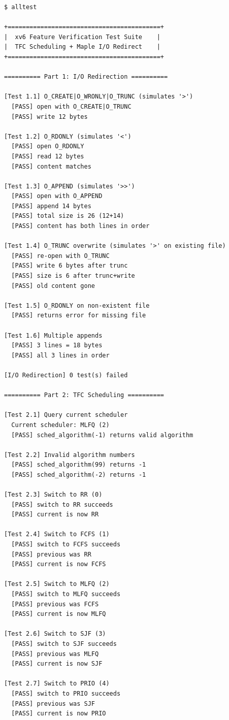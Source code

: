 \documentclass[12pt,a4paper]{ctexart}
\begin{document}
\begin{lstlisting}[caption={alltest 完整运行结果（43项全部通过）}]
$ alltest

+==========================================+
|  xv6 Feature Verification Test Suite    |
|  TFC Scheduling + Maple I/O Redirect    |
+==========================================+

========== Part 1: I/O Redirection ==========

[Test 1.1] O_CREATE|O_WRONLY|O_TRUNC (simulates '>')
  [PASS] open with O_CREATE|O_TRUNC
  [PASS] write 12 bytes

[Test 1.2] O_RDONLY (simulates '<')
  [PASS] open O_RDONLY
  [PASS] read 12 bytes
  [PASS] content matches

[Test 1.3] O_APPEND (simulates '>>')
  [PASS] open with O_APPEND
  [PASS] append 14 bytes
  [PASS] total size is 26 (12+14)
  [PASS] content has both lines in order

[Test 1.4] O_TRUNC overwrite (simulates '>' on existing file)
  [PASS] re-open with O_TRUNC
  [PASS] write 6 bytes after trunc
  [PASS] size is 6 after trunc+write
  [PASS] old content gone

[Test 1.5] O_RDONLY on non-existent file
  [PASS] returns error for missing file

[Test 1.6] Multiple appends
  [PASS] 3 lines = 18 bytes
  [PASS] all 3 lines in order

[I/O Redirection] 0 test(s) failed

========== Part 2: TFC Scheduling ==========

[Test 2.1] Query current scheduler
  Current scheduler: MLFQ (2)
  [PASS] sched_algorithm(-1) returns valid algorithm

[Test 2.2] Invalid algorithm numbers
  [PASS] sched_algorithm(99) returns -1
  [PASS] sched_algorithm(-2) returns -1

[Test 2.3] Switch to RR (0)
  [PASS] switch to RR succeeds
  [PASS] current is now RR

[Test 2.4] Switch to FCFS (1)
  [PASS] switch to FCFS succeeds
  [PASS] previous was RR
  [PASS] current is now FCFS

[Test 2.5] Switch to MLFQ (2)
  [PASS] switch to MLFQ succeeds
  [PASS] previous was FCFS
  [PASS] current is now MLFQ

[Test 2.6] Switch to SJF (3)
  [PASS] switch to SJF succeeds
  [PASS] previous was MLFQ
  [PASS] current is now SJF

[Test 2.7] Switch to PRIO (4)
  [PASS] switch to PRIO succeeds
  [PASS] previous was SJF
  [PASS] current is now PRIO


\end{lstlisting}
\end{document}
